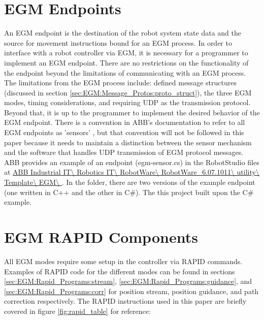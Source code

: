 \documentclass{cslthse-msc}
\begin{document}
\section{EGM Endpoints}
\label{sec:EGM:Endpoints}
An EGM endpoint is the destination of the robot system state data and the source for movement instructions bound for an EGM process. In order to interface with a robot controller via EGM, it is necessary for a programmer to implement an EGM endpoint. There are no restrictions on the functionality of the endpoint beyond the limitations of communicating with an EGM process. The limitations from the EGM process include: defined message structures (discussed in section \ref{sec:EGM:Message_Protos:proto_struct}), the three EGM modes, timing considerations, and requiring UDP as the transmission protocol. Beyond that, it is up to the programmer to implement the desired behavior of the EGM endpoint. There is a convention in ABB's documentation to refer to all EGM endpoints as 'sensors' \cite[Sec. 9.3.3]{ABB:controller_software}, but that convention will not be followed in this paper because it needs to maintain a distinction between the sensor mechanism and the software that handles UDP transmission of EGM protocol messages. ABB provides an example of an endpoint (egm-sensor.cs) in the RobotStudio files at \url{ABB Industrial IT\ Robotics IT\ RobotWare\ RobotWare_6.07.1011\ utility\ Template\ EGM\ }. In the folder, there are two versions of the example endpoint (one written in C++ and the other in C\#). The this project built upon the C\# example. 

\section{EGM RAPID Components}
\label{sec:EGM:Rapid_Components}
All EGM modes require some setup in the controller via RAPID commands. Examples of RAPID code for the different modes can be found in sections \ref{sec:EGM:Rapid_Programs:stream}, \ref{sec:EGM:Rapid_Programs:guidance}, and \ref{sec:EGM:Rapid_Programs:corr} for position stream, position guidance, and path correction respectively. The RAPID instructions used in this paper are briefly covered in figure \ref{fig:rapid_table} for reference: 
\end{document}
